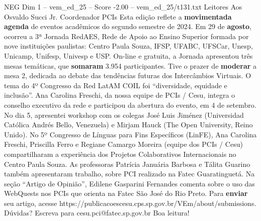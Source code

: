 \begin{textsample}{NEG Dim 1 – vem\_ed\_25 – Score -2.00 – vem\_ed\_25/t131.txt}  \label{ex:f1_neg_116}
Leitores Aos Osvaldo Succi Jr.
Coordenador PCIs Esta edição reflete a \textbf{movimentada} \textbf{agenda} de eventos acadêmicos do segundo semestre de 2024.
Em 29 de \textbf{agosto}, ocorreu a 3ª Jornada RedAES, Rede de Apoio ao Ensino Superior formada por nove instituições paulistas: Centro Paula Souza, IFSP, UFABC, UFSCar, Unesp, Unicamp, Unifesp, Univesp e USP.
On-line e gratuita, a Jornada apresentou três mesas temáticas, que \textbf{somaram} 3.954 participantes.
Tive o prazer de \textbf{moderar} a mesa 2, dedicada ao debate das tendências futuras dos Intercâmbios Virtuais.
O tema do 4º Congresso da Red LatAM COIL foi “diversidade, equidade e inclusão”.
Ana Carolina Freschi, da nossa equipe de PCIs / Cesu, integra o conselho executivo da rede e participou da abertura do evento, em 4 de setembro.
No dia 5, apresentei workshop com os colegas José Luis Jiménez (Universidad Católica Andrés Bello, Venezuela) e Mirjam Hauck (The Open University, Reino Unido).
No 5º Congresso de Línguas para Fins Específicos (LinFE), Ana Carolina Freschi, Priscilla Ferro e Regiane Camargo Moreira (equipe dos PCIs / Cesu) compartilharam a experiência dos Projetos Colaborativos Internacionais no Centro Paula Souza.
As professoras Patrícia Januária Barbosa e Tálita Guarino também apresentaram trabalho, sobre PCI realizado na Fatec Guaratinguetá.
Na seção “Artigo de Opinião”, Edilene Gasparini Fernandes comenta sobre o uso das WebQuests nos PCIs que orienta na Fatec São José do Rio Preto.
Para \textbf{enviar} seu artigo, acesse https://publicacoescesu.cps.sp.gov.br/VEm/about/submissions.
Dúvidas?
Escreva para cesu.pci@fatec.sp.gov.br Boa leitura!

\end{textsample}

